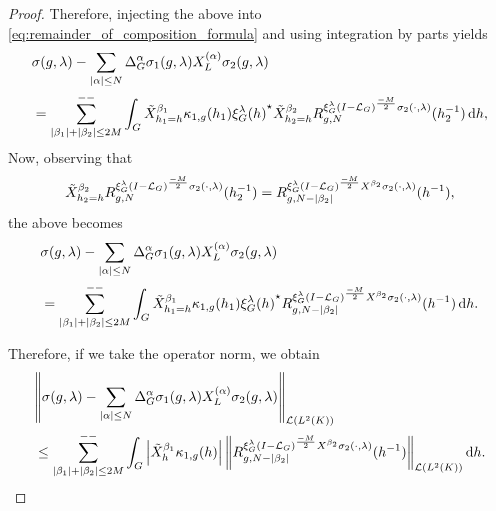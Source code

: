\begin{proof}
    Therefore,
    injecting the above into \eqref{eq:remainder_of_composition_formula} and using integration by parts yields
    \begin{align*}
        &\sigma(g, \lambda) - \sum_{\abs \alpha \leq N} \DifferenceOperatorOrder \alpha \sigma_1(g, \lambda) \TaylorLeftDifferentialOperator \alpha \sigma_2(g, \lambda)\\
        &= \lcsum{\abs {\beta_1} + \abs {\beta_2} \leq 2M} \int_\Group \RightDifferentialOperator[h_1 = h] {\beta_1} \kappa_{1, g}(h_1) \adj {\Rep \lambda(h)} \RightDifferentialOperator[h_2 = h] {\beta_2}\TaylorRemainder {\Rep \lambda \BesselPotential {-M} \sigma_2(\dummy, \lambda)} g N (h_2^{-1}) \dd h,
    \end{align*}
    Now, observing that
    \begin{align*}
        \RightDifferentialOperator[h_2 = h] {\beta_2}\TaylorRemainder {\Rep \lambda \BesselPotential {-M} \sigma_2(\dummy, \lambda)} g N (h_2^{-1})
        =
        \TaylorRemainder {\Rep \lambda \BesselPotential {-M} \LeftDifferentialOperator {\beta_2} \sigma_2(\dummy, \lambda)} g {N - \abs {\beta_2}} (h^{-1}),
    \end{align*}
    the above becomes
    \begin{align*}
        &\sigma(g, \lambda) - \sum_{\abs \alpha \leq N} \DifferenceOperatorOrder \alpha \sigma_1(g, \lambda) \TaylorLeftDifferentialOperator \alpha \sigma_2(g, \lambda)\\
        &= \lcsum{\abs {\beta_1} + \abs {\beta_2} \leq 2M} \int_\Group \RightDifferentialOperator[h_1 = h] {\beta_1} \kappa_{1, g}(h_1) \adj {\Rep \lambda(h)} \TaylorRemainder {\Rep \lambda \BesselPotential {-M} \LeftDifferentialOperator {\beta_2} \sigma_2(\dummy, \lambda)} g {N - \abs {\beta_2}} (h^{-1}) \dd h.
    \end{align*}

    Therefore,
    if we take the operator norm,
    we obtain
    \begin{align*}
        &\norm [\Lin {\Lebesgue 2 \CompactGroup}] {\sigma(g, \lambda) - \sum_{\abs \alpha \leq N} \DifferenceOperatorOrder \alpha \sigma_1(g, \lambda) \TaylorLeftDifferentialOperator \alpha \sigma_2(g, \lambda)}\\
        &\leq \lcsum{\abs {\beta_1} + \abs {\beta_2} \leq 2M} \int_\Group \abs {\RightDifferentialOperator[h] {\beta_1} \kappa_{1, g}(h)}
        \norm [\Lin {\Lebesgue 2 \CompactGroup}] {\TaylorRemainder {\Rep \lambda \BesselPotential {-M} \LeftDifferentialOperator {\beta_2} \sigma_2(\dummy, \lambda)} g {N - \abs {\beta_2}} (h^{-1})} \dd h.
    \end{align*}


\end{proof}

